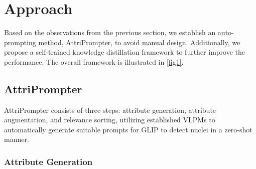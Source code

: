 \documentclass[journal,twoside,web]{ieeecolor}
\begin{document}
\section{Approach}
Based on the observations from the previous section, we establish an auto-prompting method, AttriPrompter, to avoid manual design. Additionally, we propose a self-trained knowledge distillation framework to further improve the performance. The overall framework is illustrated in \autoref{fig1}.

\subsection{AttriPrompter}

AttriPrompter consists of three steps: attribute generation, attribute augmentation, and relevance sorting, utilizing established VLPMs to automatically generate suitable prompts for GLIP to detect nuclei in a zero-shot manner.
\subsubsection{Attribute Generation}

\begin{table}[t]
\caption{Mean Average Precision (mAP) on the MoNuSeg Testing Set Using Varied Text Prompts. The prompt descriptions incrementally increase in detail from top to bottom.}
\label{tab:PAdegree}
\begin{center}
\begin{small}
\end{small}
\end{center}
\vskip -0.1in
\end{table}
\end{document}
